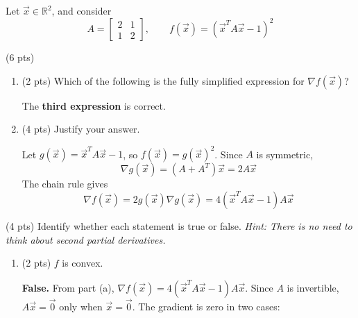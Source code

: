 \documentclass[11pt]{article}
\begin{document}
\begin{prob}[(18 pts)]
Let $\vec x\in\mathbb R^2$, and consider
\[
A=\begin{bmatrix}2&1\\1&2\end{bmatrix},\qquad
f(\vec x)=\left(\vec x^TA\vec x-1\right)^2
\]
\begin{subprob}(6 pts)
\begin{enumerate}[label=(\roman*)]
\item (2 pts) Which of the following is the fully simplified expression for $\nabla f(\vec x)$?\par\vspace{0.2em}
\noindent{}\unskip\hfill
{}\unskip\hfill
{}\unskip\hfill
{}\unskip
\par\vspace{0.3cm}
\begin{solution}
The \textbf{third expression} is correct.
\end{solution}
\item (4 pts) Justify your answer.\par\vspace{0.2em}

\begin{solution}
Let $g(\vec x)=\vec x^TA\vec x-1$, so $f(\vec x)=g(\vec x)^2$. Since $A$ is symmetric,
\[
\nabla g(\vec x)=(A+A^T)\vec x=2A\vec x
\]
The chain rule gives
\[
\boxed{\nabla f(\vec x)=2g(\vec x)\nabla g(\vec x)=4(\vec x^TA\vec x-1)A\vec x}
\]
\end{solution}
\end{enumerate}
\end{subprob}
\vspace{0.3cm}
\begin{subprob}(4 pts)
Identify whether each statement is true or false. \textit{Hint: There is no need to think about second partial derivatives.}\par\vspace{0.3cm}
\begin{enumerate}[label=(\roman*)]
\item (2 pts) $f$ is convex.
 

\begin{solution}
\textbf{False.} From part (a), $\nabla f(\vec x)=4(\vec x^TA\vec x-1)A\vec x$. Since $A$ is invertible, $A\vec x=\vec 0$ only when $\vec x=\vec 0$. The gradient is zero in two cases:


\end{solution}
\end{enumerate}
\end{subprob}
\end{prob}
\end{document}
